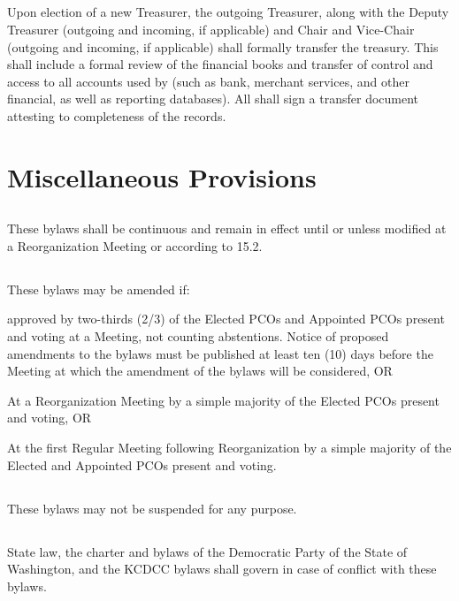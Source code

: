 \subsection{}
Upon election of a new Treasurer, the outgoing Treasurer, along with the Deputy Treasurer (outgoing and incoming, if applicable) and Chair and Vice-Chair (outgoing and incoming, if applicable) shall formally transfer the treasury. This shall include a formal review of the financial books and transfer of control and access to all accounts used by \thedistrict{} (such as bank, merchant services, and other financial, as well as reporting databases). All shall sign a transfer document attesting to completeness of the records.

\section{Miscellaneous Provisions}
\subsection{}
These bylaws shall be continuous and remain in effect until or unless modified at a Reorganization Meeting or according to 15.2.

\subsection{}
These bylaws may be amended if:
\begin{inlinealphalist}
    \item approved by two-thirds (2/3) of the Elected PCOs and Appointed PCOs present and voting at a Meeting, not counting abstentions. Notice of proposed amendments to the bylaws must be published at least ten (10) days before the Meeting at which the amendment of the bylaws will be considered, OR
    \item At a Reorganization Meeting by a simple majority of the Elected PCOs present and voting, OR
    \item At the first Regular Meeting following Reorganization by a simple majority of the Elected and Appointed PCOs present and voting.
\end{inlinealphalist}

\subsection{}
These bylaws may not be suspended for any purpose.

\subsection{}
State law, the charter and bylaws of the Democratic Party of the State of Washington, and the KCDCC bylaws shall govern in case of conflict with these bylaws.

